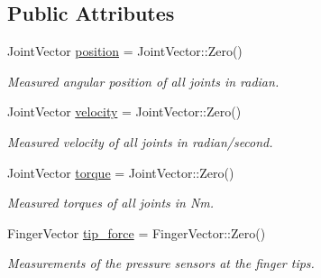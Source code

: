 \subsection*{Public Attributes}
\begin{DoxyCompactItemize}
\item 
\mbox{\label{structrobot__interfaces_1_1NFingerObservation_ac830302468e0dee99c3c1e7e388267c3}} 
Joint\+Vector \hyperlink{structrobot__interfaces_1_1NFingerObservation_ac830302468e0dee99c3c1e7e388267c3}{position} = Joint\+Vector\+::\+Zero()
\begin{DoxyCompactList}\small\item\em Measured angular position of all joints in radian. \end{DoxyCompactList}\item 
\mbox{\label{structrobot__interfaces_1_1NFingerObservation_a27ebb82cb119786e1ae9f85f89dfa76a}} 
Joint\+Vector \hyperlink{structrobot__interfaces_1_1NFingerObservation_a27ebb82cb119786e1ae9f85f89dfa76a}{velocity} = Joint\+Vector\+::\+Zero()
\begin{DoxyCompactList}\small\item\em Measured velocity of all joints in radian/second. \end{DoxyCompactList}\item 
\mbox{\label{structrobot__interfaces_1_1NFingerObservation_a693ccc700f9506bcc73cb12b63275194}} 
Joint\+Vector \hyperlink{structrobot__interfaces_1_1NFingerObservation_a693ccc700f9506bcc73cb12b63275194}{torque} = Joint\+Vector\+::\+Zero()
\begin{DoxyCompactList}\small\item\em Measured torques of all joints in Nm. \end{DoxyCompactList}\item 
Finger\+Vector \hyperlink{structrobot__interfaces_1_1NFingerObservation_a48ea78dfbc3e17a313a312d758d27343}{tip\+\_\+force} = Finger\+Vector\+::\+Zero()
\begin{DoxyCompactList}\small\item\em Measurements of the pressure sensors at the finger tips. \end{DoxyCompactList}\end{DoxyCompactItemize}
